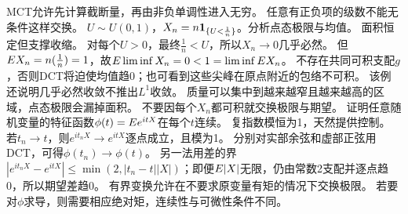 {MCT允许先计算截断量，再由非负单调性进入无穷。}
{任意有正负项的级数不能无条件这样交换。}
{$U\sim U(0,1)$，$X_n=n\mathbf1_{\{U<\frac{1}{n}\}}$。分析点态极限与均值。}
{面积恒定但支撑收缩。}
{对每个$U>0$，最终$\frac{1}{n}<U$，所以$X_n\to0$几乎必然。
但$E X_n=n(\frac{1}{n})=1$，故$E\liminf X_n=0<1=\liminf E X_n$。
不存在共同可积支配$g$，否则DCT将迫使均值趋0；也可看到这些尖峰在原点附近的包络不可积。
该例还说明几乎必然收敛不推出$L^1$收敛。}
{质量可以集中到越来越窄且越来越高的区域，点态极限会漏掉面积。}
{不要因每个$X_n$都可积就交换极限与期望。}
{证明任意随机变量的特征函数$\phi(t)=E e^{itX}$在每个$t$连续。}
{复指数模恒为1，天然提供控制。}
{若$t_n\to t$，则$e^{it_nX}\to e^{itX}$逐点成立，且模为1。
分别对实部余弦和虚部正弦用DCT，可得$\phi(t_n)\to\phi(t)$。
另一法用差的界$|e^{it_nX}-e^{itX}|\le\min(2,|t_n-t||X|)$；即便$E|X|$无限，仍由常数2支配并逐点趋0，所以期望差趋0。}
{有界变换允许在不要求原变量有矩的情况下交换极限。}
{若要对$\phi$求导，则需要相应绝对矩，连续性与可微性条件不同。}


